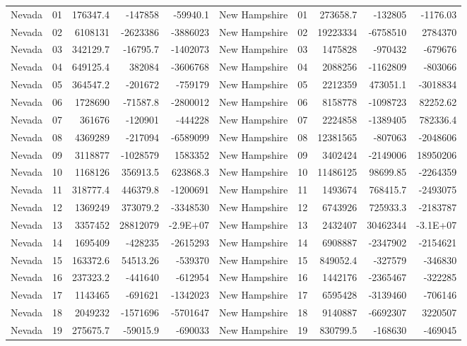 \begin{landscape}
\begin{singlespace}
\begin{longtable}{lrrrr|lrrrr}
		Nevada &  01  & 176347.4 & -147858 & -59940.1 & New Hampshire &  01  & 273658.7 & -132805 & -1176.03 \\
		Nevada &  02  & 6108131 & -2623386 & -3886023 & New Hampshire &  02  & 19223334 & -6758510 & 2784370 \\
		Nevada &  03  & 342129.7 & -16795.7 & -1402073 & New Hampshire &  03  & 1475828 & -970432 & -679676 \\
		Nevada &  04  & 649125.4 & 382084 & -3606768 & New Hampshire &  04  & 2088256 & -1162809 & -803066 \\
		Nevada &  05  & 364547.2 & -201672 & -759179 & New Hampshire &  05  & 2212359 & 473051.1 & -3018834 \\
		Nevada &  06  & 1728690 & -71587.8 & -2800012 & New Hampshire &  06  & 8158778 & -1098723 & 82252.62 \\
		Nevada &  07  & 361676 & -120901 & -444228 & New Hampshire &  07  & 2224858 & -1389405 & 782336.4 \\
		Nevada &  08  & 4369289 & -217094 & -6589099 & New Hampshire &  08  & 12381565 & -807063 & -2048606 \\
		Nevada &  09  & 3118877 & -1028579 & 1583352 & New Hampshire &  09  & 3402424 & -2149006 & 18950206 \\
		Nevada &  10 & 1168126 & 356913.5 & 623868.3 & New Hampshire &  10 & 11486125 & 98699.85 & -2264359 \\
		Nevada &  11 & 318777.4 & 446379.8 & -1200691 & New Hampshire &  11 & 1493674 & 768415.7 & -2493075 \\
		Nevada &  12 & 1369249 & 373079.2 & -3348530 & New Hampshire &  12 & 6743926 & 725933.3 & -2183787 \\
		Nevada &  13 & 3357452 & 28812079 & -2.9E+07 & New Hampshire &  13 & 2432407 & 30462344 & -3.1E+07 \\
		Nevada &  14 & 1695409 & -428235 & -2615293 & New Hampshire &  14 & 6908887 & -2347902 & -2154621 \\
		Nevada &  15 & 163372.6 & 54513.26 & -539370 & New Hampshire &  15 & 849052.4 & -327579 & -346830 \\
		Nevada &  16 & 237323.2 & -441640 & -612954 & New Hampshire &  16 & 1442176 & -2365467 & -322285 \\
		Nevada &  17 & 1143465 & -691621 & -1342023 & New Hampshire &  17 & 6595428 & -3139460 & -706146 \\
		Nevada &  18 & 2049232 & -1571696 & -5701647 & New Hampshire &  18 & 9140887 & -6692307 & 3220507 \\
		Nevada &  19 & 275675.7 & -59015.9 & -690033 & New Hampshire &  19 & 830799.5 & -168630 & -469045 \\

\end{longtable}
\end{singlespace}
\end{landscape}
